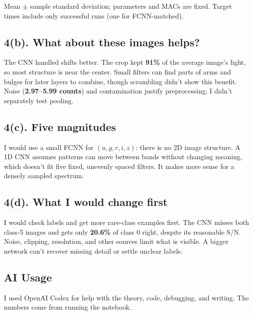 \documentclass[11pt,a4paper]{article}
\begin{document}
\begin{minipage}{\linewidth}
Mean \(\pm\) sample standard deviation; parameters and MACs are fixed. Target times include only successful runs (one for FCNN-matched).




\subsection*{4(b). What about these images helps?}

The CNN handled shifts better. The crop kept \textbf{91\%} of the average image's light, so most structure is near the center. Small filters can find parts of arms and bulges for later layers to combine, though scrambling didn't show this benefit. Noise (\textbf{2.97--5.99 counts}) and contamination justify preprocessing; I didn't separately test pooling.


\subsection*{4(c). Five magnitudes}

I would use a small FCNN for $(u,g,r,i,z)$: there is no 2D image structure. A 1D CNN assumes patterns can move between bands without changing meaning, which doesn't fit five fixed, unevenly spaced filters. It makes more sense for a densely sampled spectrum.


\subsection*{4(d). What I would change first}

I would check labels and get more rare-class examples first. The CNN misses both class-5 images and gets only \textbf{20.6\%} of class 0 right, despite its reasonable S/N. Noise, clipping, resolution, and other sources limit what is visible. A bigger network can't recover missing detail or settle unclear labels.

\label{discussion-end}


\subsection*{AI Usage}

I used OpenAI Codex for help with the theory, code, debugging, and writing. The numbers come from running the notebook.

\end{minipage}
\end{document}
